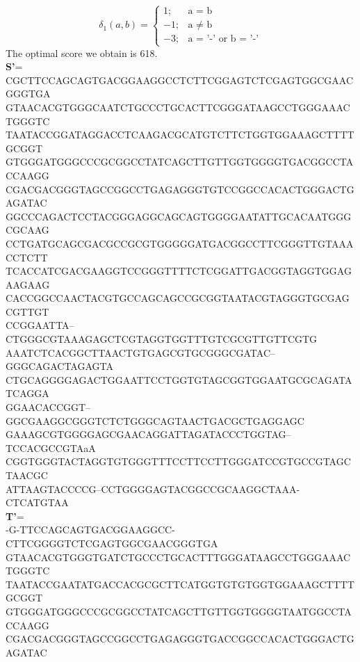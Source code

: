 \documentclass[11pt]{article}
\begin{document}
\begin{CJK}{UTF8}{gkai}
\begin{equation}
\delta_1(a,b)=
\begin{cases}
  	    1; &\text{a = b}\\
           -1; &\text{a $\neq$ b}\\ 
	   -3; &\text{a = '-' or b = '-'}
\end{cases}
\end{equation}
The optimal score we obtain is 618.\\
{\tiny
{\bf S'}=\\
CGCTTCCAGCAGTGACGGAAGGCCTCTTCGGAGTCTCGAGTGGCGAACGGGTGA\\
GTAACACGTGGGCAATCTGCCCTGCACTTCGGGATAAGCCTGGGAAACTGGGTC\\
TAATACCGGATAGGACCTCAAGACGCATGTCTTCTGGTGGAAAGCTTTTGCGGT\\
GTGGGATGGGCCCGCGGCCTATCAGCTTGTTGGTGGGGTGACGGCCTACCAAGG\\
CGACGACGGGTAGCCGGCCTGAGAGGGTGTCCGGCCACACTGGGACTGAGATAC\\
GGCCCAGACTCCTACGGGAGGCAGCAGTGGGGAATATTGCACAATGGGCGCAAG\\
CCTGATGCAGCGACGCCGCGTGGGGGATGACGGCCTTCGGGTTGTAAACCTCTT\\
TCACCATCGACGAAGGTCCGGGTTTTCTCGGATTGACGGTAGGTGGAGAAGAAG\\
CACCGGCCAACTACGTGCCAGCAGCCGCGGTAATACGTAGGGTGCGAGCGTTGT\\
CCGGAATTA--CTGGGCGTAAAGAGCTCGTAGGTGGTTTGTCGCGTTGTTCGTG\\
AAATCTCACGGCTTAACTGTGAGCGTGCGGGCGATAC--GGGCAGACTAGAGTA\\
CTGCAGGGGAGACTGGAATTCCTGGTGTAGCGGTGGAATGCGCAGATATCAGGA\\
GGAACACCGGT--GGCGAAGGCGGGTCTCTGGGCAGTAACTGACGCTGAGGAGC\\
GAAAGCGTGGGGAGCGAACAGGATTAGATACCCTGGTAG--TCCACGCCGTAaA\\
CGGTGGGTACTAGGTGTGGGTTTCCTTCCTTGGGATCCGTGCCGTAGCTAACGC\\
ATTAAGTACCCCG--CCTGGGGAGTACGGCCGCAAGGCTAAA-CTCATGTAA\\ 
}
{\tiny
{\bf T'}=\\
-G-TTCCAGCAGTGACGGAAGGCC-CTTCGGGGTCTCGAGTGGCGAACGGGTGA\\
GTAACACGTGGGTGATCTGCCCTGCACTTTGGGATAAGCCTGGGAAACTGGGTC\\
TAATACCGAATATGACCACGCGCTTCATGGTGTGTGGTGGAAAGCTTTTGCGGT\\
GTGGGATGGGCCCGCGGCCTATCAGCTTGTTGGTGGGGTAATGGCCTACCAAGG\\
CGACGACGGGTAGCCGGCCTGAGAGGGTGACCGGCCACACTGGGACTGAGATAC\\
}
\end{CJK}
\end{document}
